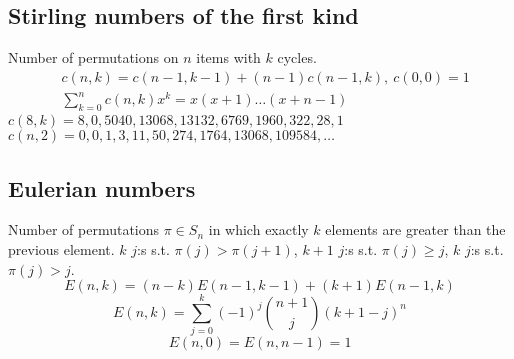 


	\subsection{Stirling numbers of the first kind}
		Number of permutations on $n$ items with $k$ cycles.
		\begin{align*}
			&c(n,k) = c(n-1,k-1) + (n-1) c(n-1,k),\ c(0,0) = 1 \\
			&\textstyle \sum_{k=0}^n c(n,k)x^k = x(x+1) \dots (x+n-1)
		\end{align*}
		$c(8,k) = 8, 0, 5040, 13068, 13132, 6769, 1960, 322, 28, 1$ \\
		$c(n,2) = 0, 0, 1, 3, 11, 50, 274, 1764, 13068, 109584, \dots$

	\subsection{Eulerian numbers}
		Number of permutations $\pi \in S_n$ in which exactly $k$ elements are greater than the previous element. $k$ $j$:s s.t. $\pi(j)>\pi(j+1)$, $k+1$ $j$:s s.t. $\pi(j)\geq j$, $k$ $j$:s s.t. $\pi(j)>j$.
		$$E(n,k) = (n-k)E(n-1,k-1) + (k+1)E(n-1,k)$$
		$$E(n,k) = \sum_{j=0}^k(-1)^j\binom{n+1}{j}(k+1-j)^n$$
		$$E(n,0) = E(n,n-1) = 1$$
		

